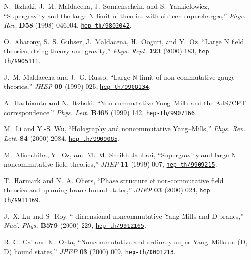 \documentclass[a4paper,twoside,titlepage,12pt]{article}
\begin{document}
\begin{thebibliography}{10}
N.~Itzhaki, J.~M. Maldacena, J.~Sonnenschein, and S.~Yankielowicz,
  ``Supergravity and the large {N} limit of theories with sixteen
  supercharges,'' {\em Phys. Rev.} {\bf D58} (1998) 046004,
\href{http://www.arXiv.org/abs/hep-th/9802042}{{\tt hep-th/9802042}}.

O.~Aharony, S.~S. Gubser, J.~Maldacena, H.~Ooguri, and Y.~Oz, ``Large {N} field
  theories, string theory and gravity,'' {\em Phys. Rept.} {\bf 323} (2000)
  183,
\href{http://www.arXiv.org/abs/hep-th/9905111}{{\tt hep-th/9905111}}.

J.~M. Maldacena and J.~G. Russo, ``Large {N} limit of non-commutative gauge
  theories,'' {\em JHEP} {\bf 09} (1999) 025,
\href{http://www.arXiv.org/abs/hep-th/9908134}{{\tt hep-th/9908134}}.

A.~Hashimoto and N.~Itzhaki, ``Non-commutative {Yang--Mills} and the {AdS/CFT}
  correspondence,'' {\em Phys. Lett.} {\bf B465} (1999) 142,
\href{http://www.arXiv.org/abs/hep-th/9907166}{{\tt hep-th/9907166}}.

M.~Li and Y.-S. Wu, ``Holography and noncommutative {Yang--Mills},'' {\em Phys.
  Rev. Lett.} {\bf 84} (2000) 2084,
\href{http://www.arXiv.org/abs/hep-th/9909085}{{\tt hep-th/9909085}}.

M.~Alishahiha, Y.~Oz, and M.~M. Sheikh-Jabbari, ``Supergravity and large {N}
  noncommutative field theories,'' {\em JHEP} {\bf 11} (1999) 007,
\href{http://www.arXiv.org/abs/hep-th/9909215}{{\tt hep-th/9909215}}.

T.~Harmark and N.~A. Obers, ``Phase structure of non-commutative field theories
  and spinning brane bound states,'' {\em JHEP} {\bf 03} (2000) 024,
\href{http://www.arXiv.org/abs/hep-th/9911169}{{\tt hep-th/9911169}}.

J.~X. Lu and S.~Roy, ``\coordHE{}-dimensional noncommutative {Yang-Mills} and
  {D}\coordHE{} branes,'' {\em Nucl. Phys.} {\bf B579} (2000) 229,
\href{http://www.arXiv.org/abs/hep-th/9912165}{{\tt hep-th/9912165}}.

R.-G. Cai and N.~Ohta, ``Noncommutative and ordinary super {Yang--Mills} on
  {(D\coordHE{}, D\coordHE{})} bound states,'' {\em JHEP} {\bf 03} (2000) 009,
\href{http://www.arXiv.org/abs/hep-th/0001213}{{\tt hep-th/0001213}}.


\end{thebibliography}
\end{document}
